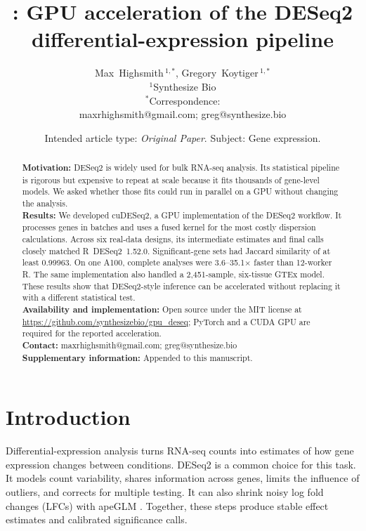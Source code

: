 \documentclass[12pt]{article}
\title{\cudeseq: GPU acceleration of the DESeq2 differential-expression
pipeline}
\author{%
Max~Highsmith\,$^{1,\ast}$, Gregory~Koytiger\,$^{1,\ast}$\\[2pt]
{\normalsize $^{1}$Synthesize Bio}\\[2pt]
{\normalsize $^{\ast}$Correspondence:}\\
{\normalsize maxrhighsmith@gmail.com; greg@synthesize.bio}}
\date{Intended article type: \emph{Original Paper}. Subject: Gene expression.}
\newcommand{\fact}[1]{#1}
\newcommand{\cudeseq}{cuDESeq2}
\begin{document}
\maketitle
\linenumbers        %
\doublespacing      %

\begin{abstract}
\noindent
\textbf{Motivation:} DESeq2 is widely used for bulk RNA-seq analysis. Its
statistical pipeline is rigorous but expensive to repeat at scale because it
fits thousands of gene-level models. We asked whether those fits could run in
parallel on a GPU without changing the analysis.\\[3pt]
\textbf{Results:} We developed \cudeseq, a GPU implementation of the DESeq2
workflow. It processes genes in batches and uses a fused kernel for the most
costly dispersion calculations. Across six real-data designs, its intermediate
estimates and final calls closely matched R~DESeq2~1.52.0. Significant-gene
sets had Jaccard similarity of at least \fact{0.99963}. On one A100, complete
analyses were \fact{3.6--35.1$\times$} faster than 12-worker R. The same
implementation also handled a 2{,}451-sample, six-tissue GTEx model. These
results show that DESeq2-style inference can be accelerated without replacing
it with a different statistical test.\\[3pt]
\textbf{Availability and implementation:} Open source under the MIT license at
\url{https://github.com/synthesizebio/gpu_deseq}; PyTorch and a CUDA GPU are
required for the reported acceleration.\\[3pt]
\textbf{Contact:} maxrhighsmith@gmail.com; greg@synthesize.bio\\[3pt]
\textbf{Supplementary information:} Appended to this manuscript.
\end{abstract}

\section{Introduction}
Differential-expression analysis turns RNA-seq counts into estimates of how
gene expression changes between conditions. DESeq2 \citep{love2014deseq2} is a
common choice for this task. It models count variability, shares information
across genes, limits the influence of outliers, and corrects for multiple
testing. It can also shrink noisy log fold changes (LFCs) with apeGLM
\citep{zhu2019apeglm}. Together, these steps produce stable effect estimates
and calibrated significance calls.
\end{document}
